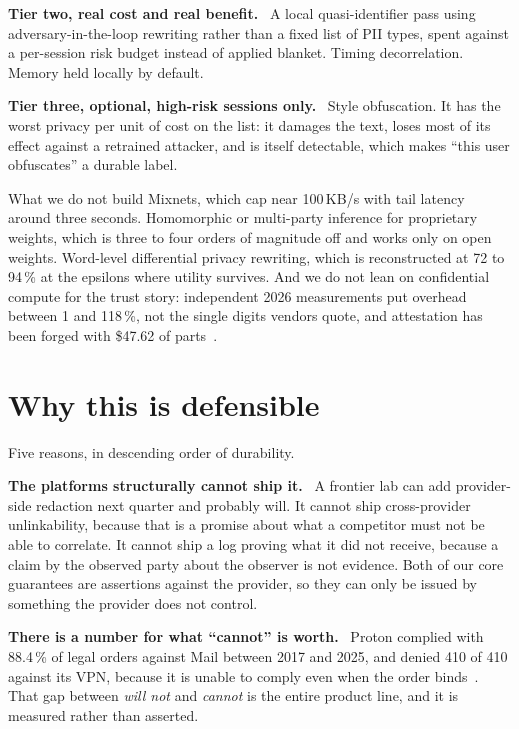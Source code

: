 \documentclass[9pt,twocolumn,a4paper]{extarticle}
\newcommand{\para}[1]{\vspace{3pt}\textbf{#1}\ }
\begin{document}
\para{Tier two, real cost and real benefit.} A local quasi-identifier pass using adversary-in-the-loop rewriting rather than a fixed list of PII types, spent against a per-session risk budget instead of applied blanket. Timing decorrelation. Memory held locally by default.

\para{Tier three, optional, high-risk sessions only.} Style obfuscation. It has the worst privacy per unit of cost on the list: it damages the text, loses most of its effect against a retrained attacker, and is itself detectable, which makes ``this user obfuscates'' a durable label.

\begin{callout}[coral]{What we do not build}
Mixnets, which cap near 100\,KB/s with tail latency around three seconds. Homomorphic or multi-party inference for proprietary weights, which is three to four orders of magnitude off and works only on open weights. Word-level differential privacy rewriting, which is reconstructed at 72 to 94\,\% at the epsilons where utility survives. And we do not lean on confidential compute for the trust story: independent 2026 measurements put overhead between 1 and 118\,\%, not the single digits vendors quote, and attestation has been forged with \$47.62 of parts~\cite{bram}.
\end{callout}

\section{Why this is defensible}
Five reasons, in descending order of durability.

\para{The platforms structurally cannot ship it.} A frontier lab can add provider-side redaction next quarter and probably will. It cannot ship cross-provider unlinkability, because that is a promise about what a competitor must not be able to correlate. It cannot ship a log proving what it did not receive, because a claim by the observed party about the observer is not evidence. Both of our core guarantees are assertions against the provider, so they can only be issued by something the provider does not control.

\para{There is a number for what ``cannot'' is worth.} Proton complied with 88.4\,\% of legal orders against Mail between 2017 and 2025, and denied 410 of 410 against its VPN, because it is unable to comply even when the order binds~\cite{proton}. That gap between \emph{will not} and \emph{cannot} is the entire product line, and it is measured rather than asserted.
\end{document}
